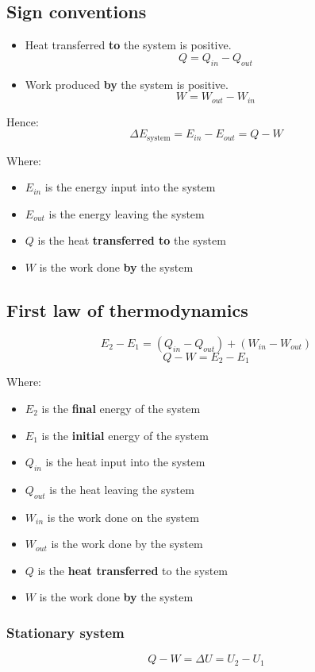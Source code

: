 \documentclass[11pt]{article}
\begin{document}
\subsection{Sign conventions}
\label{sec:org58e8cb3}
\begin{itemize}
\item Heat transferred \textbf{to} the system is positive.
\[Q = Q_{in} - Q_{out}\]

\item Work produced \textbf{by} the system is positive.
\[W = W_{out} - W_{in}\]
\end{itemize}

Hence:
\[\Delta E_{\text{system}} = E_{in} - E_{out} = Q - W\]

Where:
\begin{itemize}
\item \(E_{in}\) is the energy input into the system
\item \(E_{out}\) is the energy leaving the system
\item \(Q\) is the heat \textbf{transferred to} the system
\item \(W\) is the work done \textbf{by} the system
\end{itemize}

\subsection{First law of thermodynamics}
\label{sec:orge88c768}
\[E_2 - E_1 = (Q_{in} - Q_{out}) + (W_{in} - W_{out})\]
\[Q - W = E_2 - E_1\]

Where:
\begin{itemize}
\item \(E_2\) is the \textbf{final} energy of the system
\item \(E_1\) is the \textbf{initial} energy of the system
\item \(Q_{in}\) is the heat input into the system
\item \(Q_{out}\) is the heat leaving the system
\item \(W_{in}\) is the work done on the system
\item \(W_{out}\) is the work done by the system
\item \(Q\) is the \textbf{heat transferred} to the system
\item \(W\) is the work done \textbf{by} the system
\end{itemize}

\subsubsection{Stationary system}
\label{sec:org1aead1a}
\[Q - W = \Delta U = U_2 - U_1\]
\end{document}
